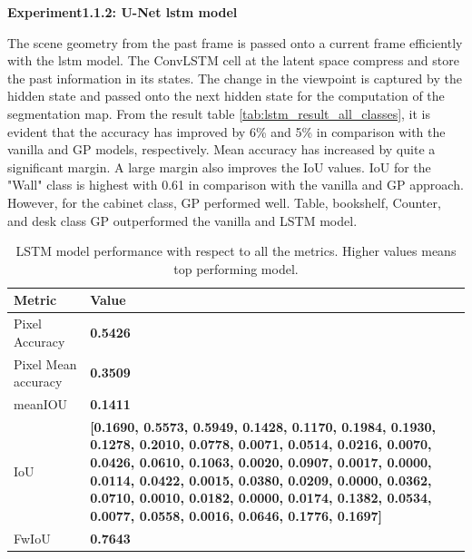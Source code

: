     \newpage
	{ \bf Experiment1.1.2: U-Net lstm model}
	
	The scene geometry from the past frame is passed onto a current frame efficiently with the lstm model. The ConvLSTM cell at the latent space compress and store the past information in its states. The change in the viewpoint is captured by the hidden state and passed onto the next hidden state for the computation of the segmentation map. From the result table \ref{tab:lstm_result_all_classes}, it is evident that the accuracy has improved by 6\% and 5\% in comparison with the vanilla and GP models, respectively. Mean accuracy has increased by quite a significant margin. A large margin also improves the IoU values. IoU for the "Wall" class is highest with 0.61 in comparison with the vanilla and GP approach. However, for the cabinet class, GP performed well. Table, bookshelf, Counter, and desk class GP outperformed the vanilla and LSTM model. 
	
	\begin{table}
	\begin{center}
		\begin{tabular}{ | l | p{12cm} |}
			\hline		
			\cellcolor{purple!30}Metric & \cellcolor{purple!30}Value \\ \hline
			Pixel Accuracy & { \bf 0.5426 }  \\ \hline
			Pixel Mean accuracy & { \bf 0.3509 }   \\ \hline
			meanIOU & { \bf 0.1411 }  \\ \hline
			IoU & { \bf [0.1690, 0.5573, 0.5949, 0.1428, 0.1170, 0.1984, 0.1930, 0.1278, 0.2010,
				0.0778, 0.0071, 0.0514, 0.0216, 0.0070, 0.0426, 0.0610, 0.1063, 0.0020,
				0.0907, 0.0017, 0.0000, 0.0114, 0.0422, 0.0015, 0.0380, 0.0209, 0.0000,
				0.0362, 0.0710, 0.0010, 0.0182, 0.0000, 0.0174, 0.1382, 0.0534, 0.0077,
				0.0558, 0.0016, 0.0646, 0.1776, 0.1697] }  \\ \hline
			FwIoU & { \bf 0.7643 }  \\ \hline
			\hline
		\end{tabular}
		\caption{LSTM model performance with respect to all the metrics. Higher values means top performing model.}
		\label{tab:caption}
	\end{center}
	\end{table}
	
